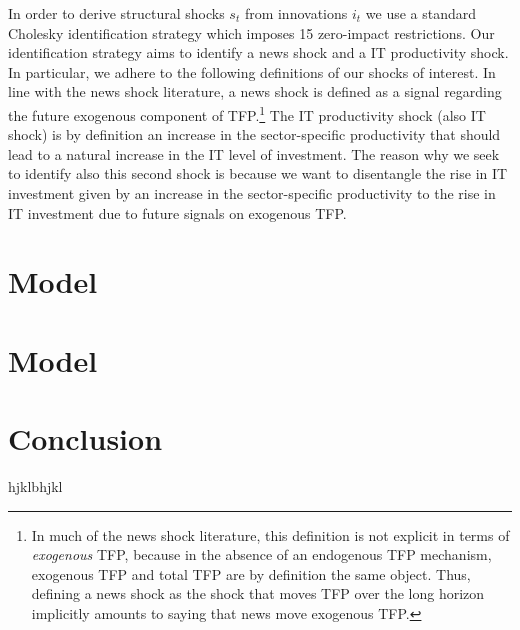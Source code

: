 \documentclass[12pt]{article}
\begin{document}
In order to derive structural shocks $s_t$ from innovations $i_t$ we use a standard Cholesky identification strategy which imposes 15 zero-impact restrictions. Our identification strategy aims to identify a news shock and a IT productivity shock. In particular, we adhere to the following definitions of our shocks of interest. In line with the news shock literature, a news shock is defined as a signal regarding the future exogenous component of TFP.\footnote{In much of the news shock literature, this definition is not explicit in terms of \emph{exogenous} TFP, because in the absence of an endogenous TFP mechanism, exogenous TFP and total TFP are by definition the same object. Thus, defining a news shock as the shock that moves TFP over the long horizon implicitly amounts to saying that news move exogenous TFP.} The IT productivity shock (also IT shock) is by definition an increase in the sector-specific productivity that should lead to a natural increase in the IT level of investment. %
The reason why we seek to identify also this second shock is because we want to disentangle the rise in IT investment given by an increase in the sector-specific productivity to the rise in IT investment due to future signals on exogenous TFP. %



\section{Model}\label{section:theory}


\section{Model}\label{section:experiments}




\section{Conclusion}\label{section:conclusions}
hjklbhjkl







 
\end{document}
